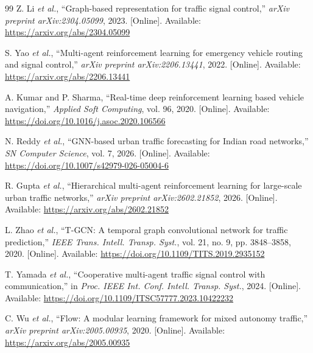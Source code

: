 \documentclass[conference]{IEEEtran}
\begin{document}
\begin{thebibliography}{99}
Z. Li \textit{et al.},
``Graph-based representation for traffic signal control,''
\textit{arXiv preprint arXiv:2304.05099}, 2023.
[Online]. Available: \url{https://arxiv.org/abs/2304.05099}

S. Yao \textit{et al.},
``Multi-agent reinforcement learning for emergency vehicle routing and
signal control,''
\textit{arXiv preprint arXiv:2206.13441}, 2022.
[Online]. Available: \url{https://arxiv.org/abs/2206.13441}

A. Kumar and P. Sharma,
``Real-time deep reinforcement learning based vehicle navigation,''
\textit{Applied Soft Computing}, vol. 96, 2020.
[Online]. Available: \url{https://doi.org/10.1016/j.asoc.2020.106566}

N. Reddy \textit{et al.},
``GNN-based urban traffic forecasting for Indian road networks,''
\textit{SN Computer Science}, vol. 7, 2026.
[Online]. Available: \url{https://doi.org/10.1007/s42979-026-05004-6}

R. Gupta \textit{et al.},
``Hierarchical multi-agent reinforcement learning for large-scale urban
traffic networks,''
\textit{arXiv preprint arXiv:2602.21852}, 2026.
[Online]. Available: \url{https://arxiv.org/abs/2602.21852}

L. Zhao \textit{et al.},
``T-GCN: A temporal graph convolutional network for traffic prediction,''
\textit{IEEE Trans. Intell. Transp. Syst.}, vol. 21, no. 9,
pp. 3848--3858, 2020.
[Online]. Available: \url{https://doi.org/10.1109/TITS.2019.2935152}

T. Yamada \textit{et al.},
``Cooperative multi-agent traffic signal control with communication,''
in \textit{Proc. IEEE Int. Conf. Intell. Transp. Syst.}, 2024.
[Online]. Available: \url{https://doi.org/10.1109/ITSC57777.2023.10422232}

C. Wu \textit{et al.},
``Flow: A modular learning framework for mixed autonomy traffic,''
\textit{arXiv preprint arXiv:2005.00935}, 2020.
[Online]. Available: \url{https://arxiv.org/abs/2005.00935}

\end{thebibliography}
\end{document}
